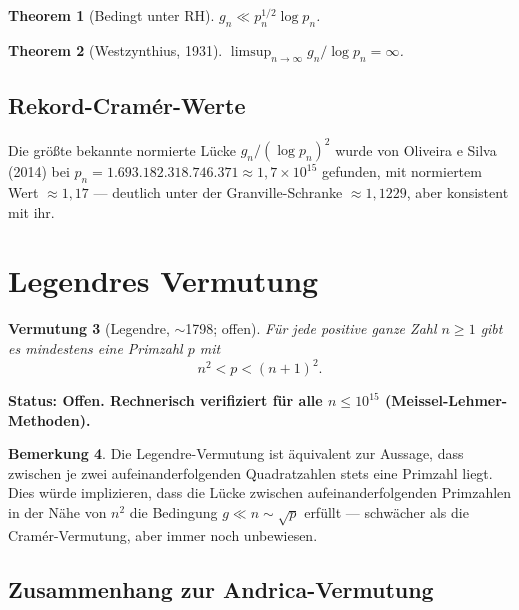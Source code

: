 \documentclass[12pt,a4paper]{amsart}
\newtheorem{theorem}{Theorem}[section]
\newtheorem{vermutung}[theorem]{Vermutung}
\theoremstyle{definition}
\newtheorem{bemerkung}[theorem]{Bemerkung}
\begin{document}
\begin{theorem}[Bedingt unter RH]
$g_n \ll p_n^{1/2} \log p_n$.
\end{theorem}

\begin{theorem}[Westzynthius, 1931]
$\limsup_{n\to\infty} g_n/\log p_n = \infty$.
\end{theorem}

\subsection{Rekord-Cram\'{e}r-Werte}

Die gr\"{o}\ss{}te bekannte normierte L\"{u}cke $g_n/(\log p_n)^2$ wurde von Oliveira e
Silva (2014) bei $p_n = 1{.}693{.}182{.}318{.}746{.}371 \approx 1{,}7 \times 10^{15}$
gefunden, mit normiertem Wert $\approx 1{,}17$ --- deutlich unter der
Granville-Schranke $\approx 1{,}1229$, aber konsistent mit ihr.

\section{Legendres Vermutung}

\begin{vermutung}[Legendre, $\sim$1798; offen]
\label{verm:legendre}
F\"{u}r jede positive ganze Zahl $n \geq 1$ gibt es mindestens eine Primzahl $p$
mit
\[
  n^2 < p < (n+1)^2.
\]
\end{vermutung}

\textbf{Status: Offen. Rechnerisch verifiziert f\"{u}r alle $n \leq 10^{15}$
(Meissel-Lehmer-Methoden).}

\begin{bemerkung}
Die Legendre-Vermutung ist \"{a}quivalent zur Aussage, dass zwischen je zwei
aufeinanderfolgenden Quadratzahlen stets eine Primzahl liegt. Dies w\"{u}rde
implizieren, dass die L\"{u}cke zwischen aufeinanderfolgenden Primzahlen in der
N\"{a}he von $n^2$ die Bedingung $g \ll n \sim \sqrt{p}$ erf\"{u}llt --- schw\"{a}cher
als die Cram\'{e}r-Vermutung, aber immer noch unbewiesen.
\end{bemerkung}

\subsection{Zusammenhang zur Andrica-Vermutung}
\end{document}
